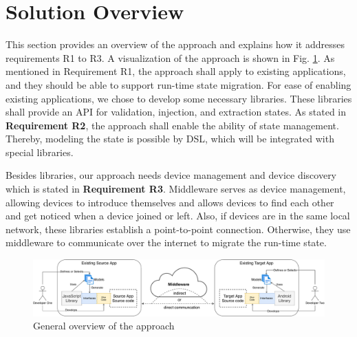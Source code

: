 \section{Solution Overview}
This section provides an overview of the approach and explains how it addresses requirements R1 to R3.
A visualization of the approach is shown in Fig. \ref{fig:solution-overview}. As mentioned in Requirement R1, the approach shall apply to existing applications, and they should be able to support run-time state migration. For ease of enabling existing applications, we chose to develop some necessary libraries. These libraries shall provide an API for validation, injection, and extraction states. As stated in \textbf{Requirement R2}, the approach shall enable the ability of state management. Thereby, modeling the state is possible by DSL, which will be integrated with special libraries.

Besides libraries, our approach needs device management and device discovery which is stated in \textbf{Requirement R3}. Middleware serves as device management, allowing devices to introduce themselves and allows devices to find each other and get noticed when a device joined or left. Also, if devices are in the same local network, these libraries establish a point-to-point connection. Otherwise, they use middleware to communicate over the internet to migrate the run-time state.

\FloatBarrier
\begin{figure}[!b]
    \includegraphics[width=\linewidth]{../figures/solution-overview}
    \centering
    \caption{General overview of the approach}
    \label{fig:solution-overview}
\end{figure}
\FloatBarrier